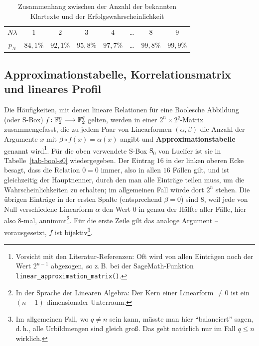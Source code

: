 \begin{refsegment}
\begin{table}
\begin{center}
  \begin{tabular}{|c|ccccccc|} \hline
		$N\lambda$ & $1$ & $2$ & $3$ & $4$ & \ldots & $8$ & $9$ \\
		$p_N$ & $84,1\%$ & $92,1\%$ & $95,8\%$ & $97,7\%$ & \ldots &
		                      $99,8\%$ & $99,9\%$ \\ \hline
  \end{tabular}
\end{center}
\caption{Zusammenhang zwischen der Anzahl der bekannten
   Klartexte
   und der Erfolgs\-wahr\-schein\-lich\-keit}\label{tab-bool-N}
\end{table}

\subsection{Approximationstabelle,
   Korrelationsmatrix und lineares
   Profil}\label{ss-bool-lpr}

Die Häufigkeiten, mit denen lineare
Relationen für eine Boolesche
Abbildung
(oder S-Box) $f\!: \mathbb{F}_2^n \longrightarrow \mathbb{F}_2^q$ gelten, werden
in einer $2^n \times 2^q$-Matrix zusammengefasst, die zu
jedem Paar von Linearformen $(\alpha,\beta)$
die Anzahl der Argumente $x$ mit $\beta\circ f(x) = \alpha(x)$ angibt und
\textbf{Approximationstabelle}
genannt wird\footnote{%
   Vorsicht mit den Literatur-Referenzen: Oft wird von allen Einträgen
   noch der Wert $2^{n-1}$ abgezogen, so z.\,B. bei der SageMath-Funktion
   {\tt linear\_approximation\_matrix()}.
}\label{fn-lin-appr}.
Für die oben verwendete S-Box $\mathrm{S}_0$ von {\sc Lucifer}
ist sie in Tabelle~\ref{tab-bool-s0} wiedergegeben. Der Eintrag $16$ in
der linken oberen Ecke besagt, dass die Relation $0 = 0$ immer, also
in allen $16$ Fällen gilt, und ist gleichzeitig der Hauptnenner, durch
den man alle Einträge teilen muss, um die Wahrscheinlichkeiten zu
erhalten; im allgemeinen Fall würde dort $2^n$ stehen. Die übrigen Einträge
in der ersten Spalte (entsprechend $\beta = 0$) sind $8$, weil jede von Null
verschiedene Linearform $\alpha$ den Wert $0$ in genau der
Hälfte aller Fälle, hier also $8$-mal, annimmt\footnote{%
   In der Sprache der Linearen Algebra:
   Der Kern einer Linearform $\neq 0$
   ist ein $(n-1)$-dimensionaler Unterraum.
}. Für die erste Zeile gilt das analoge
Argument -- vorausgesetzt, $f$ ist bijektiv\footnote{%
   Im allgemeinen Fall, wo $q \neq n$ sein kann, müsste man hier
   "`balanciert"' sagen, d.\,h., alle Urbildmengen sind gleich groß.
   Das geht natürlich nur im Fall $q \leq n$ wirklich.
}.


\end{refsegment}
